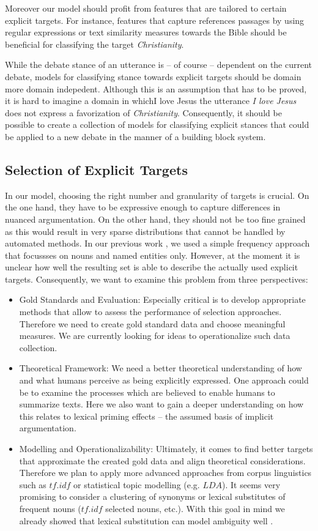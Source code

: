 \documentclass[11pt]{article}
\begin{document}
Moreover our model should profit from features that are tailored to certain explicit targets.
For instance, features that capture references passages by using regular expressions or text similarity measures towards the Bible should be beneficial for classifying the target \textit{Christianity}.

While the debate stance of an utterance is -- of course -- dependent on the current debate, models for classifying stance towards explicit targets should be domain more domain indepedent. 
Although this is an assumption that has to be proved, it is hard to imagine a domain in whichI love Jesus the utterance \textit{I love Jesus} does not express a favorization of \textit{Christianity}.
Consequently, it should be possible to create a collection of models for classifying explicit stances that could be applied to a new debate in the manner of a building block system.


\subsection{Selection of Explicit Targets}
In our model, choosing the right number and granularity of targets is crucial.
On the one hand, they have to be expressive enough to capture differences in nuanced argumentation.
On the other hand, they should not be too fine grained as this would result in very sparse distributions that cannot be handled by automated methods.
In our previous work \cite{wojatzki2016stanceBased}, we used a simple frequency approach that focussses on nouns and named entities only.
However, at the moment it is unclear how well the resulting set is able to describe the actually used explicit targets. 
Consequently, we want to examine this problem from three perspectives:
\begin{itemize}
  \item Gold Standards and Evaluation: Especially critical is to develop appropriate methods that allow to assess the performance of selection approaches. Therefore we need to create gold standard data and choose meaningful measures. We are currently looking for ideas to operationalize such data collection. 
  \item Theoretical Framework: We need a better theoretical understanding of how and what humans perceive as being explicitly expressed. One approach could be to examine the processes which are believed to enable humans to summarize texts. Here we also want to gain a deeper understanding on how this relates to lexical priming effects -- the assumed basis of implicit argumentation.
  \item Modelling and Operationalizability: Ultimately, it comes to find better targets that approximate  the created gold data and align theoretical considerations. Therefore we plan to apply more advanced approaches from corpus linguistics such as $tf.idf$ or statistical topic modelling (e.g. $LDA$). It seems very promising to consider a clustering of synonyms or lexical substitutes of frequent nouns ($tf.idf$ selected nouns, etc.). With this goal in mind we already showed that lexical substitution can model ambiguity well \cite{wojatzki2016bundled}.
\end{itemize}
\end{document}
